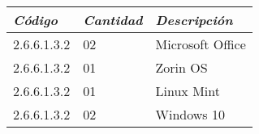             \begin{table}[h!]
                \centering
                \begin{tabular}{|p{3cm}|p{2cm}|p{5cm}|} \hline
                    
                
                \textit{{\bf{Código}}} &
                \textit{{\bf{Cantidad}}} &
                \textit{{\bf{Descripción}}}
                \\ \hline

                2.6.6.1.3.2 &
                02 &
                Microsoft Office
                \\ \hline

                2.6.6.1.3.2 &
                01 &
                Zorin OS
                \\ \hline

                2.6.6.1.3.2 &
                01 &
                Linux Mint
                \\ \hline

                2.6.6.1.3.2 &
                02 &
                Windows 10
                \\ \hline

                \end{tabular}
            \end{table}
